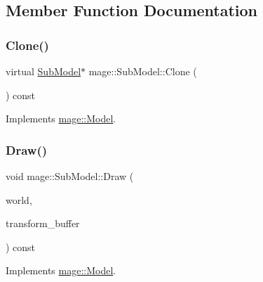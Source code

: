 \subsection{Member Function Documentation}
\hypertarget{classmage_1_1_sub_model_a368bcc2ee819cc29ec0203e314ae91d3}{}\label{classmage_1_1_sub_model_a368bcc2ee819cc29ec0203e314ae91d3} 
\subsubsection{\texorpdfstring{Clone()}{Clone()}}
{\footnotesize\ttfamily virtual \hyperlink{classmage_1_1_sub_model}{Sub\+Model}$\ast$ mage\+::\+Sub\+Model\+::\+Clone (\begin{DoxyParamCaption}{ }\end{DoxyParamCaption}) const\hspace{0.3cm}{\ttfamily [virtual]}}



Implements \hyperlink{classmage_1_1_model_ae5e9bee52da0db8c7a29920c13ed40ea}{mage\+::\+Model}.

\hypertarget{classmage_1_1_sub_model_a2fa14949edacbe995749f4b05bdc3cf5}{}\label{classmage_1_1_sub_model_a2fa14949edacbe995749f4b05bdc3cf5} 
\subsubsection{\texorpdfstring{Draw()}{Draw()}\hspace{0.1cm}{\footnotesize\ttfamily [1/2]}}
{\footnotesize\ttfamily void mage\+::\+Sub\+Model\+::\+Draw (\begin{DoxyParamCaption}\item[{const \hyperlink{classmage_1_1_world}{World} \&}]{world,  }\item[{const Transform\+Buffer \&}]{transform\+\_\+buffer }\end{DoxyParamCaption}) const\hspace{0.3cm}{\ttfamily [virtual]}}



Implements \hyperlink{classmage_1_1_model_a766c89cdac2e3df748cd73f8ed8bbff5}{mage\+::\+Model}.

\hypertarget{classmage_1_1_sub_model_a16400e2d0cc14a38fba18971e227d2ee}{}\label{classmage_1_1_sub_model_a16400e2d0cc14a38fba18971e227d2ee} 
